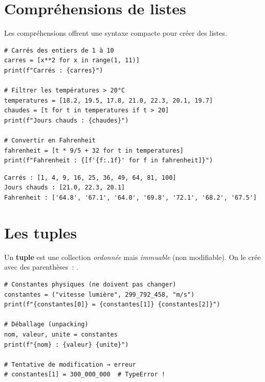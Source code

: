 \section{Compr\'ehensions de listes}

Les compr\'ehensions offrent une syntaxe compacte pour cr\'eer des listes.

\begin{codeblock}[title=\textbf{Python}]
\begin{verbatim}
# Carrés des entiers de 1 à 10
carres = [x**2 for x in range(1, 11)]
print(f"Carrés : {carres}")

# Filtrer les températures > 20°C
temperatures = [18.2, 19.5, 17.8, 21.0, 22.3, 20.1, 19.7]
chaudes = [t for t in temperatures if t > 20]
print(f"Jours chauds : {chaudes}")

# Convertir en Fahrenheit
fahrenheit = [t * 9/5 + 32 for t in temperatures]
print(f"Fahrenheit : {[f'{f:.1f}' for f in fahrenheit]}")
\end{verbatim}
\end{codeblock}

\begin{codeoutput}
\begin{verbatim}
Carrés : [1, 4, 9, 16, 25, 36, 49, 64, 81, 100]
Jours chauds : [21.0, 22.3, 20.1]
Fahrenheit : ['64.8', '67.1', '64.0', '69.8', '72.1', '68.2', '67.5']
\end{verbatim}
\end{codeoutput}

\section{Les tuples}

\begin{definition}[Tuple]
Un \textbf{tuple} est une collection \emph{ordonn\'ee} mais \emph{immuable}
(non modifiable). On le cr\'ee avec des parenth\`eses~: .
\end{definition}

\begin{codeblock}[title=\textbf{Python}]
\begin{verbatim}
# Constantes physiques (ne doivent pas changer)
constantes = ("vitesse lumière", 299_792_458, "m/s")
print(f"{constantes[0]} = {constantes[1]} {constantes[2]}")

# Déballage (unpacking)
nom, valeur, unite = constantes
print(f"{nom} : {valeur} {unite}")

# Tentative de modification → erreur
# constantes[1] = 300_000_000  # TypeError !
\end{verbatim}
\end{codeblock}

